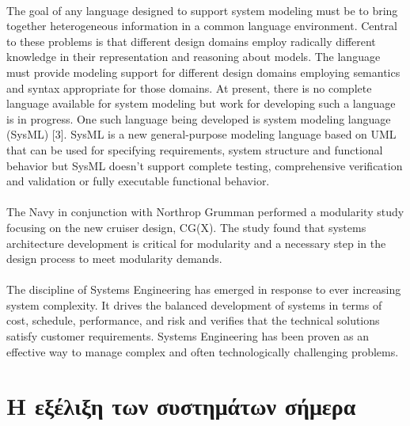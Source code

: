 \documentclass[a4paper,12pt,twoside]{report}
\begin{document}
			\paragraph{} {The goal of any language designed to support system modeling must be to bring together heterogeneous information in a common language environment. Central to these problems is that different design domains employ radically different knowledge in their representation and reasoning about models. The language must provide modeling support for different design domains employing semantics and syntax appropriate for those domains. At present, there is no complete language available for system modeling but work for developing such a language is in progress. One such language being developed is system modeling language (SysML) [3]. SysML is a new general-purpose modeling language based on UML that can be used for specifying requirements, system structure and functional behavior but SysML doesn’t support complete testing, comprehensive verification and validation or fully executable functional behavior. \cite{SMWirelessSensorNetwork}
			}
			
			\paragraph{} {The Navy in conjunction with Northrop Grumman performed a modularity study focusing on the new cruiser design, CG(X). The study found that systems architecture development is critical for modularity and a necessary step in the design process to meet modularity demands. \cite{MBSESystemArchitectureNavalShipDesign}
			}
			
			\paragraph{} {The discipline of Systems Engineering has emerged in response to ever increasing system complexity. It drives the balanced development of systems in terms of cost, schedule, performance, and risk and verifies that the technical solutions satisfy customer requirements. Systems Engineering has been proven as an effective way to manage complex and often technologically challenging problems. \cite{MBSESystemArchitectureNavalShipDesign}
			}

		\section{Η εξέλιξη των συστημάτων σήμερα}
\end{document}
